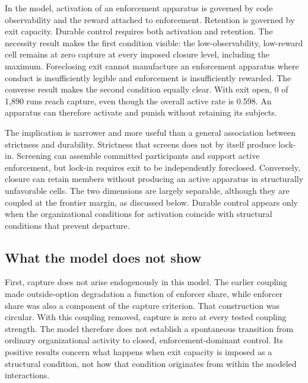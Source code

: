 \documentclass[12pt]{article}
\begin{document}
In the model, activation of an enforcement apparatus is governed by code observability and the reward attached to enforcement. Retention is governed by exit capacity. Durable control requires both activation and retention. The necessity result makes the first condition visible: the low-observability, low-reward cell remains at zero capture at every imposed closure level, including the maximum. Foreclosing exit cannot manufacture an enforcement apparatus where conduct is insufficiently legible and enforcement is insufficiently rewarded. The converse result makes the second condition equally clear. With exit open, 0 of 1,890 runs reach capture, even though the overall active rate is 0.598. An apparatus can therefore activate and punish without retaining its subjects.

The implication is narrower and more useful than a general association between strictness and durability. Strictness that screens does not by itself produce lock-in. Screening can assemble committed participants and support active enforcement, but lock-in requires exit to be independently foreclosed. Conversely, closure can retain members without producing an active apparatus in structurally unfavorable cells. The two dimensions are largely separable, although they are coupled at the frontier margin, as discussed below. Durable control appears only when the organizational conditions for activation coincide with structural conditions that prevent departure.

\subsection{What the model does not show}

First, capture does not arise endogenously in this model. The earlier coupling made outside-option degradation a function of enforcer share, while enforcer share was also a component of the capture criterion. That construction was circular. With this coupling removed, capture is zero at every tested coupling strength. The model therefore does not establish a spontaneous transition from ordinary organizational activity to closed, enforcement-dominant control. Its positive results concern what happens when exit capacity is imposed as a structural condition, not how that condition originates from within the modeled interactions.
\end{document}
